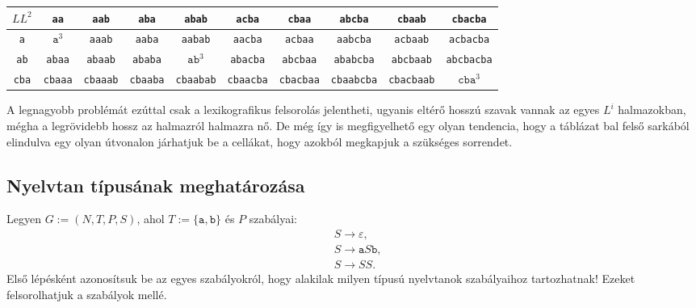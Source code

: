 \documentclass[a4paper,11pt]{article}
\newcommand{\emptyword}{\varepsilon}
\newcommand{\prodrule}[2]{#1 \longrightarrow #2}
\begin{document}
	\begin{center}
		\begin{small}
			\begin{tabular}{|c|c|c|c|c|c|c|c|c|c|}
				\hline
				$LL^2 $& \texttt{aa} & \texttt{aab} & \texttt{aba} & \texttt{abab} & \texttt{acba} & \texttt{cbaa} & \texttt{abcba} & \texttt{cbaab} & \texttt{cbacba} \\
				\hline
				\texttt{a} & $\texttt{a}^3$ & \texttt{aaab} & \texttt{aaba} & \texttt{aabab} & \texttt{aacba} & \texttt{acbaa} & \texttt{aabcba} & \texttt{acbaab} & \texttt{acbacba} \\
				\hline
				\texttt{ab} & \texttt{abaa} & \texttt{abaab} & \texttt{ababa} & $\texttt{ab}^3$ & \texttt{abacba} & \texttt{abcbaa} & \texttt{ababcba} & \texttt{abcbaab} & \texttt{abcbacba} \\
				\hline
				\texttt{cba} & \texttt{cbaaa} & \texttt{cbaaab} & \texttt{cbaaba} & \texttt{cbaabab} & \texttt{cbaacba} & \texttt{cbacbaa} & \texttt{cbaabcba} & \texttt{cbacbaab} & $\texttt{cba}^3$ \\
				\hline
			\end{tabular}
		\end{small}
	\end{center}
	
	A legnagyobb problémát ezúttal csak a lexikografikus felsorolás jelentheti, ugyanis eltérő hosszú szavak vannak az egyes $L^i$ halmazokban, mégha a legrövidebb hossz az halmazról halmazra nő. De még így is megfigyelhető egy olyan tendencia, hogy a táblázat bal felső sarkából elindulva egy olyan útvonalon járhatjuk be a cellákat, hogy azokból megkapjuk a szükséges sorrendet.

\newpage

\subsection{Nyelvtan típusának meghatározása}

Legyen $G := (N, T, P, S)$, ahol $T := \{ \texttt{a}, \texttt{b} \}$ és $P$ szabályai:
\begin{align*}
	&\prodrule{S}{\emptyword}, \\
	&\prodrule{S}{\texttt{a}S\texttt{b}}, \\
	&\prodrule{S}{SS}.
\end{align*}
Első lépésként azonosítsuk be az egyes szabályokról, hogy alakilak milyen típusú nyelvtanok szabályaihoz tartozhatnak! Ezeket felsorolhatjuk a szabályok mellé. 
\end{document}
